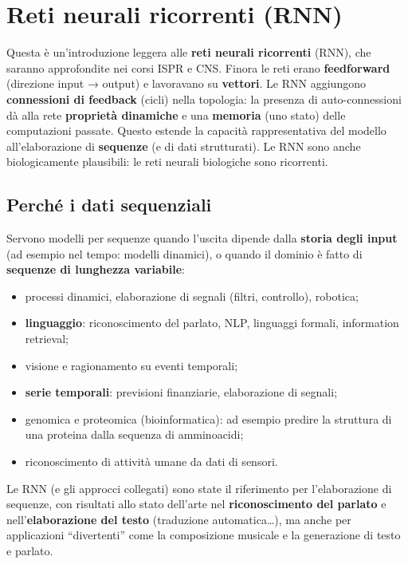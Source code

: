\chapter{Reti neurali ricorrenti (RNN)}\label{ch-20}

Questa è un'introduzione leggera alle \textbf{reti neurali ricorrenti}
(RNN), che saranno approfondite nei corsi ISPR e CNS. Finora le reti
erano \textbf{feedforward} (direzione input → output) e lavoravano su
\textbf{vettori}. Le RNN aggiungono \textbf{connessioni di feedback}
(cicli) nella topologia: la presenza di auto-connessioni dà alla rete
\textbf{proprietà dinamiche} e una \textbf{memoria} (uno stato) delle
computazioni passate. Questo estende la capacità rappresentativa del
modello all'elaborazione di \textbf{sequenze} (e di dati strutturati).
Le RNN sono anche biologicamente plausibili: le reti neurali biologiche
sono ricorrenti.

\section{Perché i dati sequenziali}\label{perchuxe9-i-dati-sequenziali}

Servono modelli per sequenze quando l'uscita dipende dalla
\textbf{storia degli input} (ad esempio nel tempo: modelli dinamici), o
quando il dominio è fatto di \textbf{sequenze di lunghezza variabile}:

\begin{itemize}
\tightlist
\item
  processi dinamici, elaborazione di segnali (filtri, controllo),
  robotica;
\item
  \textbf{linguaggio}: riconoscimento del parlato, NLP, linguaggi
  formali, information retrieval;
\item
  visione e ragionamento su eventi temporali;
\item
  \textbf{serie temporali}: previsioni finanziarie, elaborazione di
  segnali;
\item
  genomica e proteomica (bioinformatica): ad esempio predire la
  struttura di una proteina dalla sequenza di amminoacidi;
\item
  riconoscimento di attività umane da dati di sensori.
\end{itemize}

Le RNN (e gli approcci collegati) sono state il riferimento per
l'elaborazione di sequenze, con risultati allo stato dell'arte nel
\textbf{riconoscimento del parlato} e nell'\textbf{elaborazione del
testo} (traduzione automatica\ldots), ma anche per applicazioni
``divertenti'' come la composizione musicale e la generazione di testo e
parlato.

